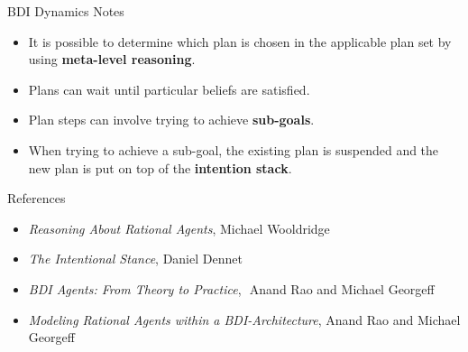 \documentclass[aspectratio=1610,xcolor=dvipsnames,t]{beamer}
\begin{document}
\begin{frame}{BDI Dynamics Notes}
    \begin{itemize} 
        \item It is possible to determine which plan is chosen in the
              applicable plan set by using \textbf{meta-level reasoning}.
        \item Plans can wait until particular beliefs are satisfied.
        \item Plan steps can involve trying to achieve \textbf{sub-goals}.
        \item When trying to achieve a sub-goal, the existing plan
              is suspended and the new plan is put on top of the
              \textbf{intention stack}. 
    \end{itemize} 
\end{frame} 

\begin{frame}{References}
    \begin{itemize} 
        \item \emph{Reasoning About Rational Agents}, Michael Wooldridge
        \item \emph{The Intentional Stance}, Daniel Dennet
        \item \emph{BDI Agents: From Theory to Practice},   Anand Rao and Michael Georgeff
        \item \emph{Modeling Rational Agents within a BDI-Architecture}, Anand Rao 
              and Michael Georgeff
    \end{itemize} 
\end{frame} 
\end{document}
